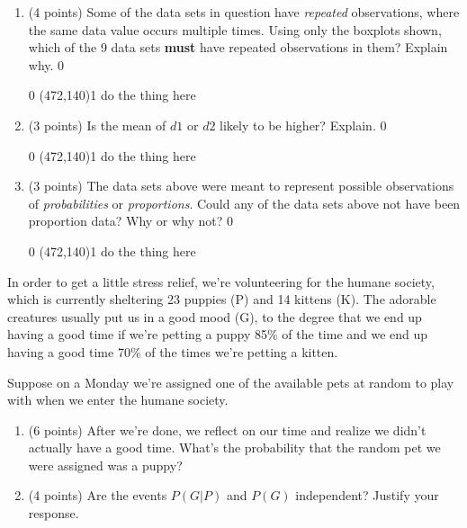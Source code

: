 \documentclass[addpoints]{exam}
\def\solutions{0}
\begin{document}
{\begin{questions}
\begin{enumerate}[label=(\alph*)]
	
	\item (4 points) Some of the data sets in question have \textit{repeated} observations, where the same data value occurs multiple times.  Using only the boxplots shown, which of the 9 data sets \textbf{must} have repeated observations in them?  Explain why.
	\if\solutions0 \vspace{2mm} \fi
	
	\if\solutions0
	\hspace{-1cm}
	\vspace{\fill}\framebox(472,140){\if\solutions1 do the thing here \fi}
	\fi

	\item (3 points)  Is the mean of $d1$ or $d2$ likely to be higher?  Explain.
\if\solutions0 \vspace{2mm} \fi

\if\solutions0
\hspace{-1cm}
\vspace{\fill}\framebox(472,140){\if\solutions1 do the thing here \fi}
\fi

	\item (3 points) The data sets above were meant to represent possible observations of \textit{probabilities} or \textit{proportions}.  Could any of the data sets above not have been proportion data?  Why or why not?
\if\solutions0 \vspace{2mm} \fi

\if\solutions0
\hspace{-1cm}
\vspace{\fill}\framebox(472,140){\if\solutions1 do the thing here \fi}
\fi
	
\end{enumerate}

\question[10] In order to get a little stress relief, we're volunteering for the humane society, which is currently sheltering 23 puppies (P) and 14 kittens (K).  The adorable creatures usually put us in a good mood (G), to the degree that we end up having a good time if we're petting a puppy 85\% of the time and we end up having a good time 70\% of the times we're petting a kitten.

Suppose on a Monday we're assigned one of the available pets at random to play with when we enter the humane society.


\begin{enumerate}[label=(\alph*)]
	\item (6 points)  After we're done, we reflect on our time and realize we didn't actually have a good time.  What's the probability that the random pet we were assigned was a puppy?
	\item (4 points) Are the events $P(G|P)$ and $P(G)$ independent?  Justify your response.
\end{enumerate}


\end{questions}}
\end{document}
